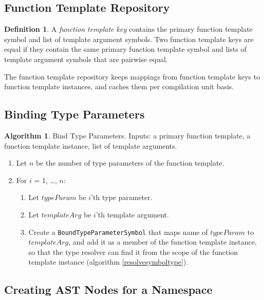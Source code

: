 \documentclass[a4paper,oneside,11pt]{book}
\theoremstyle{definition}
\newtheorem{algo}{Algorithm}[section]
\newtheorem{defn}{Definition}[section]
\begin{document}
\subsection{Function Template Repository}

\begin{defn}\label{functiontemplatekey} A \emph{function template key} contains the primary function template symbol and list of template argument symbols.
Two function template keys are equal if they contain the same primary function template symbol and
lists of template argument symbols that are pairwise equal.
\end{defn}

The function template repository keeps mappings from function template keys to function template instances, and caches them per compilation unit basis.

\subsection{Binding Type Parameters}

\begin{algo}\label{bindtypeparams} Bind Type Parameters. Inputs: a primary function template, a function template instance, list of template arguments.
\begin{enumerate}
\item
Let $n$ be the number of type parameters of the function template.
\item
For $i$ = 1, \ldots, $n$:
\begin{enumerate}
\item
Let $typeParam$ be $i$'th type parameter.
\item
Let $templateArg$ be $i$'th template argument.
\item
Create a \verb|BoundTypeParameterSymbol| that maps name of $typeParam$ to $templateArg$, and add it as a member of the function template instance,
so that the type resolver can find it from the scope of the function template instance (algorithm \ref{resolvesymboltype}).
\end{enumerate}
\end{enumerate}
\end{algo}

\subsection{Creating AST Nodes for a Namespace}
\end{document}
